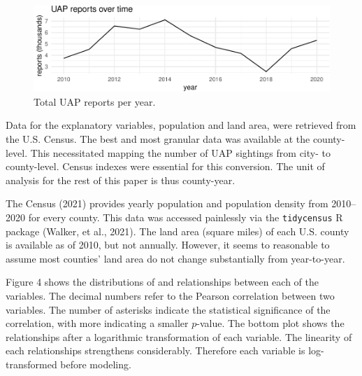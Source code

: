 \documentclass[]{elsarticle} %
\begin{document}
\begin{figure}

{\centering \includegraphics[width=1\linewidth]{lmm_paper_files/figure-latex/unnamed-chunk-5-1} 

}

\caption{Total UAP reports per year.}\label{fig:unnamed-chunk-5}
\end{figure}

Data for the explanatory variables, population and land area, were
retrieved from the U.S. Census. The best and most granular data was
available at the county-level. This necessitated mapping the number of
UAP sightings from city- to county-level. Census indexes were essential
for this conversion. The unit of analysis for the rest of this paper is
thus county-year.

The Census (2021) provides yearly population and population density from
2010--2020 for every county. This data was accessed painlessly via the
\texttt{tidycensus} R package (Walker, et al., 2021). The land area
(square miles) of each U.S. county is available as of 2010, but not
annually. However, it seems to reasonable to assume most counties' land
area do not change substantially from year-to-year.

Figure 4 shows the distributions of and relationships between each of
the variables. The decimal numbers refer to the Pearson correlation
between two variables. The number of asterisks indicate the statistical
significance of the correlation, with more indicating a smaller
\(p\)-value. The bottom plot shows the relationships after a logarithmic
transformation of each variable. The linearity of each relationships
strengthens considerably. Therefore each variable is log-transformed
before modeling.
\end{document}
